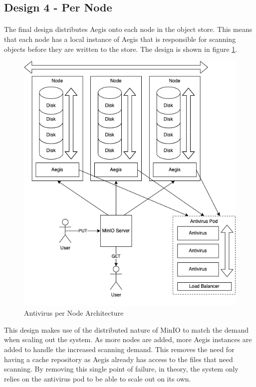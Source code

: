 \documentclass[12pt, conference, final, a4paper, onecolumn, compsoc]{IEEEtran}
\begin{document}

\subsection*{Design 4 - Per Node}
\paragraph{}

The final design distributes Aegis onto each node in the object store. This
means that each node has a local instance of Aegis that is responsible for
scanning objects before they are written to the store. The design is shown in
figure \ref{fig:perNodeArch}.

\begin{figure}
  \centering \includegraphics[scale=.3]{diagrams/per-node.png}
  \caption{Antivirus per Node Architecture}
  \label{fig:perNodeArch}
\end{figure}

This design makes use of the distributed nature of MinIO to match the demand
when scaling out the system. As more nodes are added, more Aegis instances are
added to handle the increased scanning demand. This removes the need for having
a cache repository as Aegis already has access to the files that need scanning.
By removing this single point of failure, in theory, the system only relies on
the antivirus pod to be able to scale out on its own.
\end{document}
